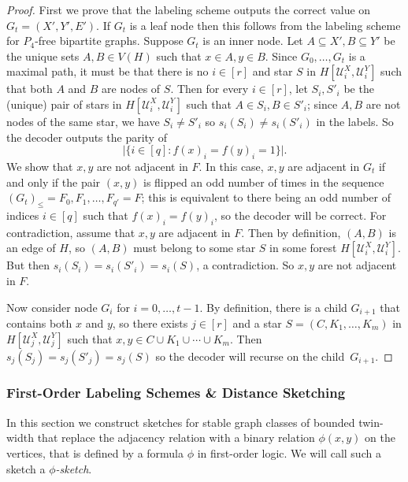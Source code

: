 \documentclass{article}
\newcommand{\cU}{\ensuremath{\mathcal{U}}}
\begin{document}
\begin{proof}
First we prove that the labeling scheme outputs the correct value on $G_t = (X',Y',E')$. If $G_t$ is
a leaf node then this follows from the labeling scheme for $P_4$-free bipartite graphs.  Suppose
$G_t$ is an inner node. Let $A \subseteq X', B \subseteq Y'$ be the unique sets $A, B \in V(H)$ such
that $x \in A, y \in B$. Since $G_0, \dotsc, G_t$ is a maximal path, it must be that there is no $i
\in [r]$ and star $S$ in $H[\cU^X_i,\cU^Y_i]$ such that both $A$ and $B$ are nodes of $S$. Then for every $i \in [r]$, let
$S_i,S'_i$ be the (unique) pair of stars in $H[\cU^X_i,\cU^Y_i]$ such that $A \in S_i, B \in S'_i$; since
$A,B$ are not nodes of the same star, we have $S_i \neq S'_i$ so $s_i(S_i) \neq s_i(S'_i)$ in the
labels. So the decoder outputs the parity of
\[
  \bigl|\bigl\{ i \in [q] : f(x)_i = f(y)_i = 1\bigr\}\bigr|.
\]
We show that $x,y$ are not adjacent in $F$. In this case, $x,y$ are adjacent in $G_t$ if and
only if the pair $(x,y)$ is flipped an odd number of times in the sequence $(G_t)_\leq = F_0, F_1,
\dotsc, F_{q'} = F$; this is equivalent to there being an odd number of indices $i \in [q]$ such
that $f(x)_i = f(y)_i$, so the decoder will be correct.
For contradiction, assume that $x,y$ are adjacent in $F$. Then by definition, $(A,B)$ is an edge of
$H$, so $(A,B)$ must belong to some star $S$ in some forest $H[\cU^X_i,\cU^Y_i]$. But then $s_i(S_i) = s_i(S'_i)
= s_i(S)$, a contradiction. So $x,y$ are not adjacent in $F$.

Now consider node $G_i$ for $i = 0, \dotsc, t-1$. By definition, there is a child $G_{i+1}$ that
contains both $x$ and $y$, so there exists $j \in [r]$ and a star $S = (C, K_1, \dotsc, K_m)$
in $H[\cU^X_j,\cU^Y_j]$ such that $x,y \in C \cup K_1 \cup \dotsm \cup K_m$. Then $s_j(S_j)=s_j(S'_j)=s_j(S)$ so
the decoder will recurse on the child~$G_{i+1}$. 
\end{proof}

\subsubsection{First-Order Labeling Schemes \& Distance Sketching}
\label{section:distance sketching}

In this section we construct sketches for stable graph classes of bounded twin-width that replace
the adjacency relation with a binary relation $\phi(x,y)$ on the vertices, that is defined by a
formula $\phi$ in first-order logic. We will call such a sketch a \emph{$\phi$-sketch}.
\end{document}
